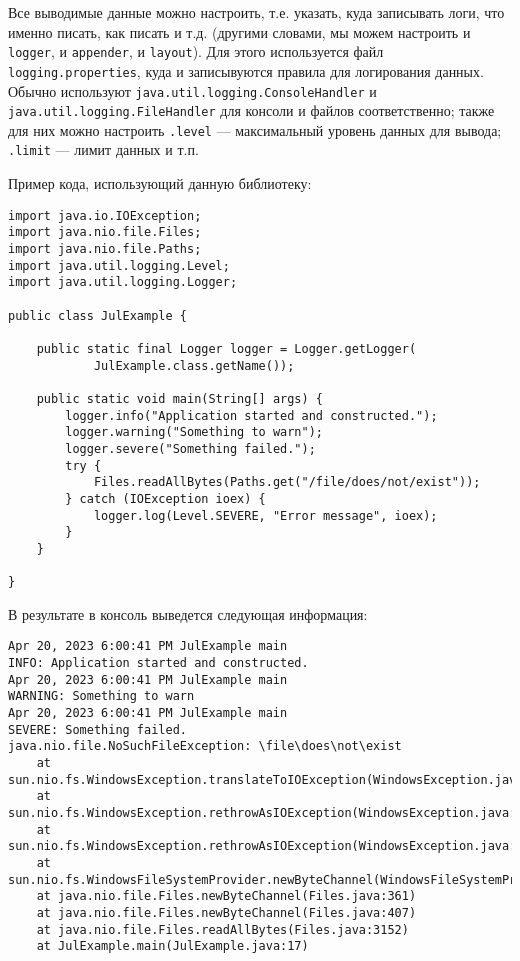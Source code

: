 Все выводимые данные можно настроить, т.е. указать, куда записывать логи, что именно писать, как писать и т.д. (другими словами, мы можем настроить и \verb|logger|, и \verb|appender|, и \verb|layout|). Для этого используется файл \verb|logging.properties|, куда и записывуются правила для логирования данных. Обычно используют \verb|java.util.logging.ConsoleHandler| и \verb|java.util.logging.FileHandler| для консоли и файлов соответственно; также для них можно настроить \verb|.level| — максимальный уровень данных для вывода; \verb|.limit| — лимит данных и т.п.

Пример кода, использующий данную библиотеку:

\begin{lstlisting}
import java.io.IOException;
import java.nio.file.Files;
import java.nio.file.Paths;
import java.util.logging.Level;
import java.util.logging.Logger;
 
public class JulExample {
 
    public static final Logger logger = Logger.getLogger(
            JulExample.class.getName());
    
    public static void main(String[] args) {
        logger.info("Application started and constructed.");
        logger.warning("Something to warn");
        logger.severe("Something failed.");
        try {
            Files.readAllBytes(Paths.get("/file/does/not/exist"));
        } catch (IOException ioex) {
            logger.log(Level.SEVERE, "Error message", ioex);
        }
    }
 
}
\end{lstlisting}

В результате в консоль выведется следующая информация:

\begin{lstlisting}
Apr 20, 2023 6:00:41 PM JulExample main
INFO: Application started and constructed.
Apr 20, 2023 6:00:41 PM JulExample main
WARNING: Something to warn
Apr 20, 2023 6:00:41 PM JulExample main
SEVERE: Something failed.
java.nio.file.NoSuchFileException: \file\does\not\exist
	at sun.nio.fs.WindowsException.translateToIOException(WindowsException.java:79)
	at sun.nio.fs.WindowsException.rethrowAsIOException(WindowsException.java:97)
	at sun.nio.fs.WindowsException.rethrowAsIOException(WindowsException.java:102)
	at sun.nio.fs.WindowsFileSystemProvider.newByteChannel(WindowsFileSystemProvider.java:230)
	at java.nio.file.Files.newByteChannel(Files.java:361)
	at java.nio.file.Files.newByteChannel(Files.java:407)
	at java.nio.file.Files.readAllBytes(Files.java:3152)
	at JulExample.main(JulExample.java:17)
\end{lstlisting}

\label{pages_total}

